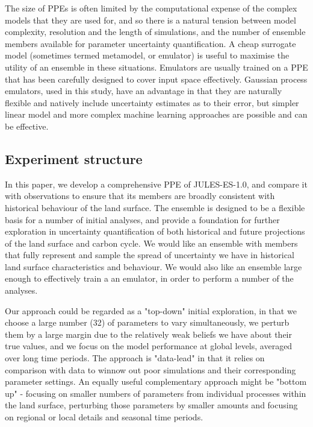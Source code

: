 \documentclass[gmd, manuscript]{copernicus}
\begin{document}
The size of PPEs is often limited by the computational expense of the complex models that they are used for, and so there is a natural tension between model complexity, resolution and the length of simulations, and the number of ensemble members available for parameter uncertainty quantification. A cheap surrogate model (sometimes termed metamodel, or emulator) is useful to maximise the utility of an ensemble in these situations. Emulators are usually trained on a PPE that has been carefully designed to cover input space effectively. Gaussian process emulators, used in this study, have an advantage in that they are naturally flexible and natively include uncertainty estimates as to their error, but simpler linear model and more complex machine learning approaches are possible and can be effective.

\subsection{Experiment structure}\label{ssec:experiment_structure}

In this paper, we develop a comprehensive PPE of JULES-ES-1.0, and compare it with observations to ensure that its members are broadly consistent with historical behaviour of the land surface. The ensemble is designed to be a flexible basis for a number of initial analyses, and provide a foundation for further exploration in uncertainty quantification of both historical and future projections of the land surface and carbon cycle.  We would like an ensemble with members that fully represent and sample the spread of uncertainty we have in historical land surface characteristics and behaviour. We would also like an ensemble large enough to effectively train a an emulator, in order to perform a number of the analyses.

Our approach could be regarded as a "top-down" initial exploration, in that we choose a large number (32) of parameters to vary simultaneously, we perturb them by a large margin due to the relatively weak beliefs we have about their true values, and we focus on the model performance at global levels, averaged over long time periods. The approach is "data-lead" in that it relies on comparison with data to winnow out poor simulations and their corresponding parameter settings. An equally useful complementary approach might be "bottom up" - focusing on smaller numbers of parameters from individual processes within the land surface, perturbing those parameters by smaller amounts and focusing on regional or local details and seasonal time periods. 
\end{document}
